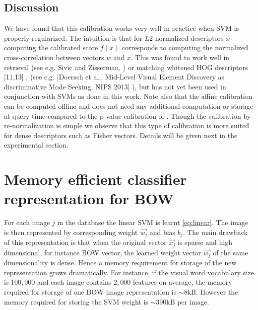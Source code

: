    \subsection{Discussion}
      We have found that this calibration works very well in practice when SVM is properly regularized.
      The intuition is that for $L2$ normalized descriptors $x$ computing the calibrated score $f(x)$ corresponds to computing the normalized cross-correlation between vectors $w$ and $x$. This was found to work well in retrieval (see e.g. Sivic and Zisserman, \cite{}) or matching whitened HOG descriptors [11,13] \cite{}, \cite{} (see e.g. [Doersch et al., Mid-Level Visual Element Discovery as discriminative Mode Seeking, NIPS 2013] \cite{}), but has not yet been used in conjunction with SVMs as done in this work. Note also that the affine calibration can be computed offline and does not need any additional computation or storage at query time compared to the p-value calibration of \cite{Gronat13}.
      Though the calibration by re-normalization is simple we observe that this type of calibration is more suited for dense descriptors such as Fisher vectors. Details will be given next in the experimental section. 


  \section{Memory efficient classifier representation for BOW}
      For each image $j$ in the database the linear SVM is learnt \eqref{eq:linear}. The image is then represented by corresponding weight $\vec{w_j}$ and bias $b_j$. The main drawback of this representation is that when the original vector $\vec{x_j}$ is sparse and high dimensional, for instance BOW vector, the learned weight vector $\vec{w_j}$ of the same dimensionality is dense. Hence a memory requirement for storage of the new representation grows dramatically. For instance, if the visual word vocabulary size is $100,000$ and each image contains $2,000$ features on average, the memory required for storage of one BOW image representation is $\sim 8$kB. However the memory required for storing the SVM weight is $\sim390$kB per image.


